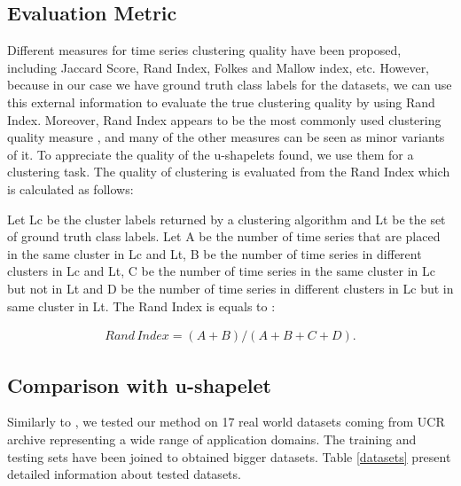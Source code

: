 \subsection{Evaluation Metric}
Different measures for time series clustering quality have been proposed, including Jaccard Score, Rand Index, Folkes and Mallow index, etc. However, because in our case we have ground truth class labels for the datasets, we can use this external information to evaluate the true clustering quality by using Rand Index. Moreover, Rand Index appears to be the most commonly used clustering quality measure \cite{zakaria2012clustering} \cite{ulanova2015scalable} \cite{zhang2016unsupervised}, and many of the other measures can be seen as minor variants of it\cite{halkidi2001clustering}.
To appreciate the quality of the u-shapelets found, we use them for a clustering task. The quality of clustering is evaluated from the Rand Index \cite{rand1971objective} which is calculated as follows:

Let Lc be the cluster labels returned by a clustering algorithm and Lt be the
set of ground truth class labels. Let A be the number of time series that are
placed in the same cluster in Lc and Lt, B be the number of time series in
different clusters in Lc and Lt, C be the number of time series in the same
cluster in Lc but not in Lt and D be the number of time series in different
clusters in Lc but in same cluster in Lt. The Rand Index is equals to : 

\begin{eqnarray}
Rand\,Index = (A+B)/(A+B+C+D).
\end{eqnarray}    

\subsection{Comparison with u-shapelet}
Similarly to \cite{dallachiesa}, we tested our method on 17 real world datasets coming from UCR archive \cite{UCRArchive} representing a wide range of application domains. The training and testing sets have been joined to obtained bigger datasets. Table \ref{datasets} present detailed information about tested datasets.




